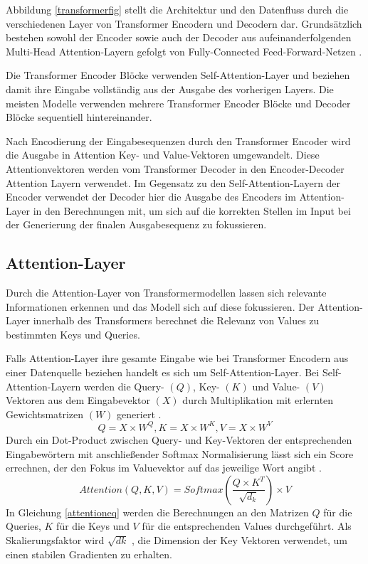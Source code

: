 Abbildung \ref{transformerfig} stellt die Architektur und den Datenfluss durch die verschiedenen Layer von Transformer Encodern und Decodern dar. 
Grundsätzlich bestehen sowohl der Encoder sowie auch der Decoder aus aufeinanderfolgenden Multi-Head Attention-Layern gefolgt von Fully-Connected Feed-Forward-Netzen \citep{AttentionIALYN}.


Die Transformer Encoder Blöcke verwenden Self-Attention-Layer und beziehen damit ihre Eingabe vollständig aus der Ausgabe des vorherigen Layers. 
Die meisten Modelle verwenden mehrere Transformer Encoder Blöcke und Decoder Blöcke sequentiell hintereinander.

Nach Encodierung der Eingabesequenzen durch den Transformer Encoder wird die Ausgabe in Attention Key- und Value-Vektoren umgewandelt.
Diese Attentionvektoren werden vom Transformer Decoder in den Encoder-Decoder Attention Layern verwendet.
Im Gegensatz zu den Self-Attention-Layern der Encoder verwendet der Decoder hier die Ausgabe des Encoders im Attention-Layer in den Berechnungen mit, um sich auf die korrekten Stellen im Input bei der Generierung der finalen Ausgabesequenz zu fokussieren.






\subsection{Attention-Layer} %
\label{attention}
Durch die Attention-Layer von Transformermodellen lassen sich relevante Informationen erkennen und das Modell sich auf diese fokussieren. 
Der Attention-Layer innerhalb des Transformers berechnet die Relevanz von Values zu bestimmten Keys und Queries. 

Falls Attention-Layer ihre gesamte Eingabe wie bei Transformer Encodern aus einer Datenquelle beziehen handelt es sich um Self-Attention-Layer.
Bei Self-Attention-Layern werden die Query- $(Q)$, Key- $(K)$ und Value- $(V)$ Vektoren aus dem Eingabevektor $(X)$ durch Multiplikation mit erlernten Gewichtsmatrizen $(W)$ generiert \citep{AttentionIALYN}. 
\begin{equation}
    Q = X \times W^{Q}, K = X \times W^{K}, V = X \times W^{V}
\end{equation}
Durch ein Dot-Product zwischen Query- und Key-Vektoren der entsprechenden Eingabewörtern mit anschließender Softmax Normalisierung lässt sich ein Score errechnen, der den Fokus im Valuevektor auf das jeweilige Wort angibt \citep{AttentionIALYN}.
\begin{equation}
    \label{attentioneq}
    Attention(Q,K,V) = Softmax(\frac{Q\times K^T}{\sqrt{d_k}})\times V
\end{equation}
In Gleichung \ref{attentioneq} werden die Berechnungen an den Matrizen $Q$ für die Queries, $K$ für die Keys und $V$ für die entsprechenden Values durchgeführt. Als Skalierungsfaktor wird $\sqrt{dk}$ , die Dimension der Key Vektoren verwendet, um einen stabilen Gradienten zu erhalten. 

